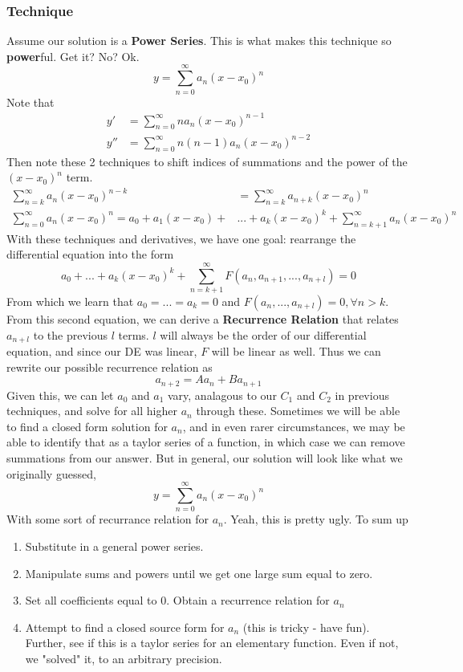 \documentclass[11pt]{article}
\begin{document}
\subsubsection{Technique}
Assume our solution is a \textbf{Power Series}. This is what makes this technique so \textbf{power}ful.
Get it? No? Ok. 
    \[ y = \sum_{n=0}^{\infty}a_n(x - x_0)^n \]
Note that 
\begin{align*}
    y' &= \sum_{n=0}^{\infty}na_n(x - x_0)^{n-1} \\
    y'' &= \sum_{n=0}^{\infty}n(n-1)a_n(x - x_0)^{n-2}
\end{align*}
Then note these 2 techniques to shift indices of summations and the power of the $(x-x_0)^n$ term.
\begin{align}
    \sum_{n=k}^{\infty} a_n (x - x_0)^{n-k} &= \sum_{n=k}^{\infty} a_{n+k} (x - x_0)^n \\
    \sum_{n=0}^{\infty} a_n (x - x_0)^n = a_0 + a_1(x - x_0) + &... + a_k(x - x_0)^k + \sum_{n=k+1}^{\infty} a_n (x - x_0)^n
\end{align}
With these techniques and derivatives, we have one goal: rearrange the differential equation into the 
form
\[ a_0 + ... + a_k(x - x_0)^k + \sum_{n=k+1}^{\infty} F(a_n, a_{n+1}, ..., a_{n+l}) = 0 \]
From which we learn that $a_0 = ... = a_k = 0$ and $F(a_n,..., a_{n+l}) = 0, \forall n > k$. From this
second equation, we can derive a \textbf{Recurrence Relation} that relates $a_{n+l}$ to the previous 
$l$ terms. $l$ will always be the order of our differential equation, and since our DE was linear, 
$F$ will be linear as well. Thus we can rewrite our possible recurrence relation as
    \[ a_{n+2} = A a_n + B a_{n+1} \]
Given this, we can let $a_0$ and $a_1$ vary, analagous to our $C_1$ and $C_2$ in previous techniques,
and solve for all higher $a_n$ through these. Sometimes we will be able to find a closed form solution
for $a_n$, and in even rarer circumstances, we may be able to identify that as a taylor series of a
function, in which case we can remove summations from our answer. But in general, our solution will
look like what we originally guessed,
    \[ y = \sum_{n=0}^{\infty}a_n(x - x_0)^n \]
With some sort of recurrance relation for $a_n$. Yeah, this is pretty ugly. To sum up
\begin{enumerate}
    \item Substitute in a general power series.
    \item Manipulate sums and powers until we get one large sum equal to zero.
    \item Set all coefficients equal to 0. Obtain a recurrence relation for $a_n$
    \item Attempt to find a closed source form for $a_n$ (this is tricky - have fun). Further, see 
          if this is a taylor series for an elementary function. Even if not, we "solved" it, to
          an arbitrary precision.
\end{enumerate}
\end{document}
